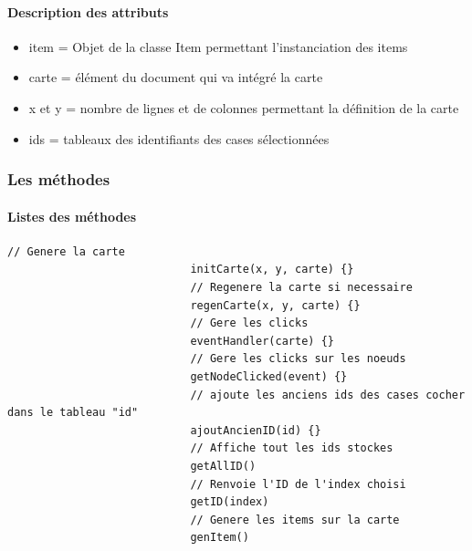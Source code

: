 \documentclass[12pt,a4paper]{report}
\begin{document}
				\paragraph{Description des attributs}
					\begin{itemize}
						\item item = Objet de la classe Item permettant l'instanciation des items
						\item carte = élément du document qui va intégré la carte
						\item x et y = nombre de lignes et de colonnes permettant la définition de la carte
						\item ids = tableaux des identifiants des cases sélectionnées 
					\end{itemize}
				\newpage
   	 		\subsubsection{Les méthodes}
				\paragraph{Listes des méthodes}
					\begin{lstlisting}[caption={Méthodes classe Carte}]
						    // Genere la carte 
						    initCarte(x, y, carte) {}
						    // Regenere la carte si necessaire
		        			regenCarte(x, y, carte) {}
	        				// Gere les clicks
	     				    eventHandler(carte) {}
    						// Gere les clicks sur les noeuds
						    getNodeClicked(event) {}
						    // ajoute les anciens ids des cases cocher dans le tableau "id"
					        ajoutAncienID(id) {}
					        // Affiche tout les ids stockes
					        getAllID()
					        // Renvoie l'ID de l'index choisi
					        getID(index)
   							// Genere les items sur la carte 
   							genItem()
					\end{lstlisting}
\end{document}
